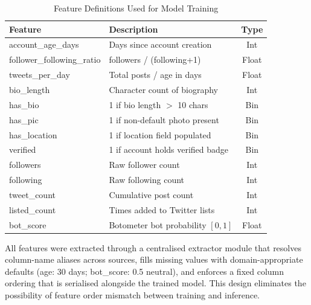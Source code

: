 \documentclass[conference]{IEEEtran}
\begin{document}
\begin{table}[htbp]
  \caption{Feature Definitions Used for Model Training}
  \label{tab:features}
  \begin{center}
    \begin{tabular}{|l|l|c|}
      \hline
      \textbf{Feature} & \textbf{Description} & \textbf{Type} \\
      \hline
      account\_age\_days        & Days since account creation       & Int   \\
      follower\_following\_ratio & followers / (following+1)          & Float \\
      tweets\_per\_day          & Total posts / age in days          & Float \\
      bio\_length               & Character count of biography       & Int   \\
      has\_bio                  & 1 if bio length $>$ 10 chars       & Bin   \\
      has\_pic                  & 1 if non-default photo present     & Bin   \\
      has\_location             & 1 if location field populated      & Bin   \\
      verified                  & 1 if account holds verified badge  & Bin   \\
      followers                 & Raw follower count                 & Int   \\
      following                 & Raw following count                & Int   \\
      tweet\_count              & Cumulative post count              & Int   \\
      listed\_count             & Times added to Twitter lists       & Int   \\
      bot\_score                & Botometer bot probability $[0,1]$  & Float \\
      \hline
    \end{tabular}
  \end{center}
\end{table}

All features were extracted through a centralised extractor module that
resolves column-name aliases across sources, fills missing values with
domain-appropriate defaults (age: 30 days; bot\_score: 0.5 neutral), and
enforces a fixed column ordering that is serialised alongside the trained
model. This design eliminates the possibility of feature order mismatch
between training and inference.
\end{document}
